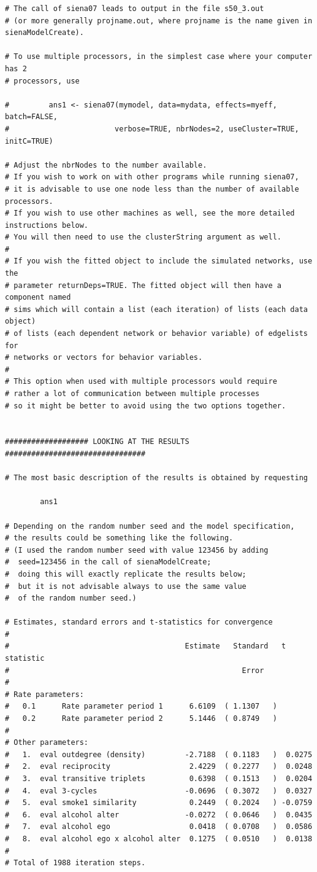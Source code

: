 \documentclass[a4paper,fleqn]{article}
\newcommand{\+}{\, + \,}
\begin{document}
{\begin{verbatim}
# The call of siena07 leads to output in the file s50_3.out
# (or more generally projname.out, where projname is the name given in sienaModelCreate).

# To use multiple processors, in the simplest case where your computer has 2
# processors, use

#         ans1 <- siena07(mymodel, data=mydata, effects=myeff, batch=FALSE,
#                        verbose=TRUE, nbrNodes=2, useCluster=TRUE, initC=TRUE)

# Adjust the nbrNodes to the number available.
# If you wish to work on with other programs while running siena07,
# it is advisable to use one node less than the number of available processors.
# If you wish to use other machines as well, see the more detailed instructions below.
# You will then need to use the clusterString argument as well.
#
# If you wish the fitted object to include the simulated networks, use the
# parameter returnDeps=TRUE. The fitted object will then have a component named
# sims which will contain a list (each iteration) of lists (each data object)
# of lists (each dependent network or behavior variable) of edgelists for
# networks or vectors for behavior variables.
#
# This option when used with multiple processors would require
# rather a lot of communication between multiple processes
# so it might be better to avoid using the two options together.


################### LOOKING AT THE RESULTS ################################

# The most basic description of the results is obtained by requesting

        ans1

# Depending on the random number seed and the model specification,
# the results could be something like the following.
# (I used the random number seed with value 123456 by adding
#  seed=123456 in the call of sienaModelCreate;
#  doing this will exactly replicate the results below;
#  but it is not advisable always to use the same value
#  of the random number seed.)

# Estimates, standard errors and t-statistics for convergence
#
#                                        Estimate   Standard   t statistic
#                                                     Error
#
# Rate parameters:
#   0.1      Rate parameter period 1      6.6109  ( 1.1307   )
#   0.2      Rate parameter period 2      5.1446  ( 0.8749   )
#
# Other parameters:
#   1.  eval outdegree (density)         -2.7188  ( 0.1183   )  0.0275
#   2.  eval reciprocity                  2.4229  ( 0.2277   )  0.0248
#   3.  eval transitive triplets          0.6398  ( 0.1513   )  0.0204
#   4.  eval 3-cycles                    -0.0696  ( 0.3072   )  0.0327
#   5.  eval smoke1 similarity            0.2449  ( 0.2024   ) -0.0759
#   6.  eval alcohol alter               -0.0272  ( 0.0646   )  0.0435
#   7.  eval alcohol ego                  0.0418  ( 0.0708   )  0.0586
#   8.  eval alcohol ego x alcohol alter  0.1275  ( 0.0510   )  0.0138
#
# Total of 1988 iteration steps.


\end{verbatim}}
\end{document}
